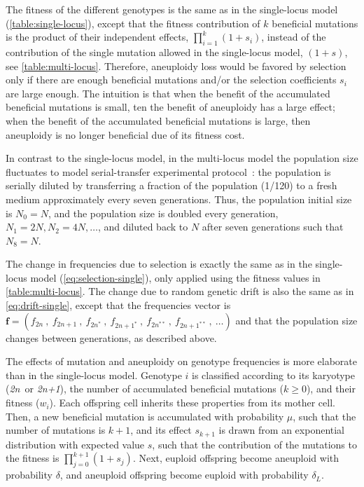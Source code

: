 \documentclass[12pt]{extarticle}
\let\vec\mathbf
\newcommand{\euwt}{\emph{2n}}
\newcommand{\anwt}{\emph{2n+1}}
\begin{document}
The fitness of the different genotypes is the same as in the single-locus model (\cref{table:single-locus}), except that the fitness contribution of $k$ beneficial mutations is the product of their independent effects, $\prod_{i=1}^k(1+s_i)$, instead of the contribution of the single mutation allowed in the single-locus model, $(1+s)$, see \cref{table:multi-locus}.
Therefore, aneuploidy loss would be favored by selection only if there are enough beneficial mutations and/or the selection coefficients $s_i$ are large enough. The intuition is that when the benefit of the accumulated beneficial mutations is small, ten the benefit of aneuploidy has a large effect; when the benefit of the accumulated beneficial mutations is large, then aneuploidy is no longer beneficial due of its fitness cost.

In contrast to the single-locus model, in the multi-locus model the population size fluctuates to model serial-transfer experimental protocol~\citep{Yona2012}: the population is serially diluted by transferring a fraction of the population (1/120) to a fresh medium approximately every seven generations. 
Thus, the population initial size is $N_0 = N$, and the population size is doubled every generation, $N_1=2N, N_2=4N, \ldots$, and diluted back to $N$ after seven generations such that $N_8=N$.

The change in frequencies due to selection is exactly the same as in the single-locus model (\cref{eq:selection-single}), only applied using the fitness values in \cref{table:multi-locus}. The change due to random genetic drift is also the same as in \cref{eq:drift-single}, except that the frequencies vector is $\vec{f}=(f_{2n}\ ,\ f_{2n+1}\ ,\ f_{2n^*}\ ,\ f_{2n+1^*}\ ,\ f_{2n^{**}}\ ,\ f_{2n+1^{**}}\ ,\ \ldots)$ and that the population size changes between generations, as described above.

The effects of mutation and aneuploidy on genotype frequencies is more elaborate than in the single-locus model.
Genotype $i$ is classified according to its karyotype (\euwt\ or \anwt), the number of accumulated beneficial mutations ($k \ge 0$), and their fitness ($w_i$).
Each offspring cell inherits these properties from its mother cell.
Then, a new beneficial mutation is accumulated with probability $\mu$, such that the number of mutations is $k+1$, and its effect $s_{k+1}$ is drawn from an exponential distribution with expected value $s$, such that the contribution of the mutations to the fitness is $\prod_{j=0}^{k+1}{(1+s_j)}$.
Next, euploid offspring become aneuploid with probability $\delta$, and aneuploid offspring become euploid with probability $\delta_L$.
\end{document}
